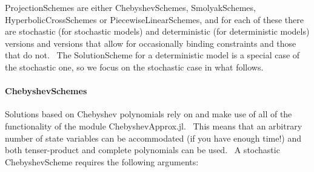 \documentclass[notitlepage,11pt]{article}
\begin{document}
ProjectionSchemes are either ChebyshevSchemes, SmolyakSchemes,
HyperbolicCrossSchemes or PiecewiseLinearSchemes, and for each of these
there are stochastic (for stochastic models) and deterministic (for
deterministic models) versions and versions that allow for occasionally
binding constraints and those that do not. \ The SolutionScheme for a
deterministic model is a special case of the stochastic one, so we focus on
the stochastic case in what follows.

\paragraph{ChebyshevSchemes}

Solutions based on Chebyshev polynomials rely on and make use of all of the
functionality of the module ChebyshevApprox.jl. \ This means that an
arbitrary number of state variables can be accommodated (if you have enough
time!) and both tenser-product and complete polynomials can be used. \ A
stochastic ChebyshevScheme requires the following arguments:
\end{document}
